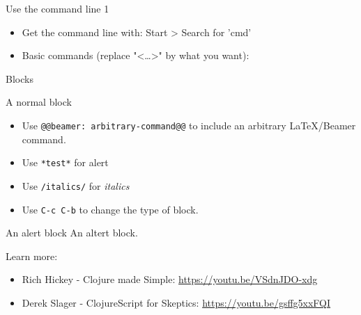 \documentclass[presentation]{beamer}
\begin{document}
\begin{frame}[label=sec-1-6]{Use the command line 1}
\begin{itemize}
\item Get the command line with: Start > Search for 'cmd'
\item Basic commands (replace "<\ldots{}>" by what you want):
\end{itemize}
\end{frame}

\begin{frame}[fragile,label=sec-1-7]{Blocks}
 \begin{block}{A normal block}
\begin{itemize}
\item Use \texttt{@@beamer: arbitrary-command@@} to include an arbitrary \LaTeX{}/Beamer command.
\item Use \texttt{*test*} for \alert{alert}
\item Use \texttt{/italics/} for \emph{italics}
\item Use \texttt{C-c C-b} to change the type of block.
\end{itemize}
\end{block}
\begin{alertblock}{An alert block}
An altert block.
\end{alertblock}
\begin{example}["An example"]

\end{example}
\end{frame}

\begin{frame}[label=sec-1-8]{Learn more:}
\begin{itemize}
\item Rich Hickey - Clojure made Simple: \url{https://youtu.be/VSdnJDO-xdg}
\item Derek Slager - ClojureScript for Skeptics: \url{https://youtu.be/gsffg5xxFQI}
\end{itemize}
\end{frame}
\end{document}
